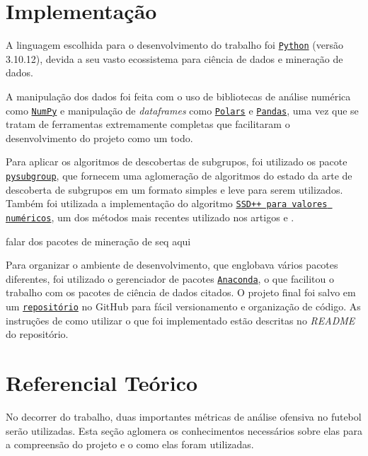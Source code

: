 \documentclass{article}
\begin{document}
\section{Implementação}

A linguagem escolhida para o desenvolvimento do trabalho foi
\href{https://www.python.org/}{\texttt{Python}} (versão 3.10.12), devida a seu
vasto ecossistema para ciência de dados e mineração de dados.

A manipulação dos dados foi feita com o uso de bibliotecas
de análise numérica como \href{https://numpy.org/}{\texttt{NumPy}} e
manipulação de \textit{dataframes} como
\href{https://pola.rs/}{\texttt{Polars}} e
\href{https://pandas.pydata.org/}{\texttt{Pandas}},
uma vez que se tratam de ferramentas extremamente completas que facilitaram o
desenvolvimento do projeto como um todo.

Para aplicar os algoritmos de descobertas de subgrupos, foi utilizado os pacote
\href{https://pysubgroup.readthedocs.io/en/latest/}{\texttt{pysubgroup}}, que fornecem 
uma aglomeração de algoritmos do estado da arte de descoberta de subgrupos em um formato simples 
e leve para serem utilizados. Também foi utilizada a implementação do algoritmo 
\href{https://github.com/HMProenca/SSDpp-numeric/tree/master}{\texttt{SSD++ para valores numéricos}},
um dos métodos mais recentes utilizado nos artigos 
\cite{proencca2021discovering}
e \cite{vagliano2023automated}.

falar dos pacotes de mineração de seq aqui

Para organizar o ambiente de desenvolvimento, que englobava vários pacotes
diferentes, foi utilizado o gerenciador de pacotes
\href{https://www.anaconda.com/}{\texttt{Anaconda}}, o que facilitou o trabalho
com os pacotes de ciência de dados citados. O projeto final foi salvo em um
\href{https://github.com/lframosferreira/projeto-ad}{\texttt{repositório}}
no GitHub para fácil versionamento e organização de código. As instruções de
como utilizar o que foi implementado estão descritas no \textit{README}
do repositório.

\section{Referencial Teórico}

No decorrer do trabalho, duas importantes métricas de análise ofensiva no
futebol serão utilizadas. Esta seção
aglomera os conhecimentos necessários sobre elas para a compreensão do projeto
e o como elas foram utilizadas.
\end{document}
